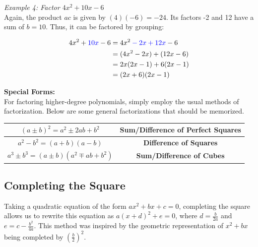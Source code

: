         \pagebreak
        \noindent \color{blue} \textit{Example 4: Factor $4x^2+10x-6$} \color{black} \\
        Again, the product $ac$ is given by $(4)(-6) = -24$. Its factors -2 and 12 have a sum
        of $b=10$. Thus, it can be factored by grouping:

        \begin{align*}
            4x^2+\color{blue}10x\color{black}-6 &= 4x^2\color{blue}-2x+12x\color{black}-6 \\
            &= (4x^2-2x) + (12x-6) \\
            &= 2x(2x-1) + 6(2x-1) \\
            &= (2x+6)(2x-1)
        \end{align*}

        \noindent \color{purple} \textbf{Special Forms:} \color{black} \\
        For factoring higher-degree polynomials, simply employ the usual methods of
        factorization. Below are some general factorizations that should be memorized.

        \begin{center}
            \begin{tabular}{|c|c|}
                \hline
                $(a\pm b)^2 = a^2\pm 2ab+b^2$         & \textbf{Sum/Difference of Perfect Squares} \\
                \hline
                $a^2-b^2=(a+b)(a-b)$                  & \textbf{Difference of Squares}             \\
                \hline
                $a^3\pm b^3=(a\pm b)(a^2 \mp ab+b^2)$ & \textbf{Sum/Difference of Cubes}           \\
                \hline
            \end{tabular}
        \end{center}



    \subsection{Completing the Square}
        Taking a quadratic equation of the form $ax^2+bx+c=0$, completing the square allows us to
        rewrite this equation as $a(x+d)^2+e=0$, where $d=\frac{b}{2a}$ and $e=c-\frac{b^2}{4a}$.
        This method was inspired by the geometric representation of $x^2+bx$ being completed by
        $\left(\frac{b}{2}\right)^2$.

